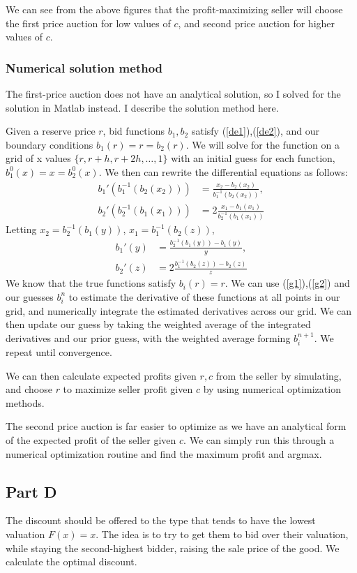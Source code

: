 \documentclass[11pt]{article} %
\begin{document}
We can see from the above figures that the profit-maximizing seller will choose the first price auction for low values of $c$, and second price auction for higher values of $c$.
\subsubsection{Numerical solution method}
The first-price auction does not have an analytical solution, so I solved for the solution in Matlab instead. I describe the solution method here.

Given a reserve price $r$, bid functions $b_1,b_2$ satisfy (\ref{de1}),(\ref{de2}), and our boundary conditions $b_1(r) = r = b_2(r)$. We will solve for the function on a grid of x values $\{r, r+h, r+2h,\dots, 1 \}$ with an initial guess for each function, $b_1^0(x) = x = b_2^0(x)$. We then can rewrite the differential equations as follows:
\begin{align*}
b_1'(b_1^{-1}(b_2(x_2))) &= \frac{x_2 - b_2(x_2)}{b_1^{-1}(b_2(x_2))},\\
b_2'(b_2^{-1}(b_1(x_1))) &= 2\frac{x_1 - b_1(x_1)}{b_2^{-1}(b_1(x_1))}
\end{align*}
Letting $x_2 = b_2^{-1}(b_1(y))$, $x_1 = b_1^{-1}(b_2(z))$,
\begin{align}
b_1'(y) &=\frac{b_2^{-1}(b_1(y)) - b_1(y)}{y}, \label{g1}\\
b_2'(z) &=2\frac{b_1^{-1}(b_2(z)) - b_2(z)}{z} \label{g2}
\end{align}
We know that the true functions satisfy $b_i(r) = r$. We can use (\ref{g1}),(\ref{g2}) and our guesses $b_i^n$ to estimate the derivative of these functions at all points in our grid, and numerically integrate the estimated derivatives across our grid. We can then update our guess by taking the weighted average of the integrated derivatives and our prior guess, with the weighted average forming $b_i^{n+1}$. We repeat until convergence. 

We can then calculate expected profits given $r,c$ from the seller by simulating, and choose $r$ to maximize seller profit given $c$ by using numerical optimization methods.

The second price auction is far easier to optimize as we have an analytical form of the expected profit of the seller given $c$. We can simply run this through a numerical optimization routine and find the maximum profit and argmax.
\subsection{Part D}
The discount should be offered to the type that tends to have the lowest valuation $F(x) = x$. The idea is to try to get them to bid over their valuation, while staying the second-highest bidder, raising the sale price of the good. We calculate the optimal discount.
\end{document}
